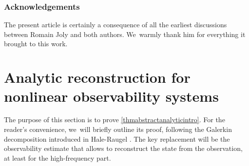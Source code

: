 \documentclass[JEP,XML,SOM,Unicode,published]{cedram}
\theoremstyle{definition}
\begin{document}
\subsubsection*{Acknowledgements} The present article is certainly a consequence of all the earliest discussions between Romain Joly and both authors. We~warmly thank him for everything it brought to this work.

\section{Analytic reconstruction for nonlinear observability systems}\label{sec:abstract-construction}

The purpose of this section is to prove \cref{thmabstractanalyticintro}. For the reader's convenience, we~will briefly outline its proof, following the Galerkin decomposition introduced in Hale-Raugel \cite{HR03}. The key replacement will be the observability estimate that allows to reconstruct the state from the observation, at least for the high-frequency part.
\end{document}
